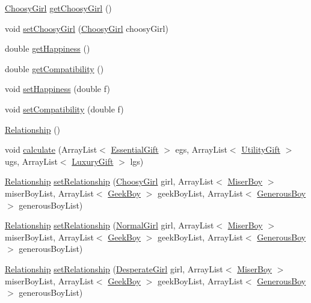 \begin{DoxyCompactItemize}
\item 
\hyperlink{class_girls_1_1_choosy_girl}{Choosy\+Girl} \hyperlink{class_utils_1_1_relationship_afa8ff5fdebceb788e026e8716ed22543}{get\+Choosy\+Girl} ()
\item 
void \hyperlink{class_utils_1_1_relationship_a5bf5b568a52759d00dfd264c2311914d}{set\+Choosy\+Girl} (\hyperlink{class_girls_1_1_choosy_girl}{Choosy\+Girl} choosy\+Girl)
\item 
double \hyperlink{class_utils_1_1_relationship_a9aa237a6824185994c0a4aedc306d23b}{get\+Happiness} ()
\item 
double \hyperlink{class_utils_1_1_relationship_ad7be14b7c0d9e8f29a30b919639c70fd}{get\+Compatibility} ()
\item 
void \hyperlink{class_utils_1_1_relationship_ac72f730e7bdccffc30abc114811ab007}{set\+Happiness} (double f)
\item 
void \hyperlink{class_utils_1_1_relationship_a188a8680e3e3b2277866fbd8906da068}{set\+Compatibility} (double f)
\item 
\hyperlink{class_utils_1_1_relationship_aadc515fc831621baa2451dd5ddcb82f4}{Relationship} ()
\item 
void \hyperlink{class_utils_1_1_relationship_a9e66175fde115be45de08f02508b0006}{calculate} (Array\+List$<$ \hyperlink{class_gifts_1_1_essential_gift}{Essential\+Gift} $>$ egs, Array\+List$<$ \hyperlink{class_gifts_1_1_utility_gift}{Utility\+Gift} $>$ ugs, Array\+List$<$ \hyperlink{class_gifts_1_1_luxury_gift}{Luxury\+Gift} $>$ lgs)
\item 
\hyperlink{class_utils_1_1_relationship}{Relationship} \hyperlink{class_utils_1_1_relationship_aef210c6f2f468e1988319b940e9648cd}{set\+Relationship} (\hyperlink{class_girls_1_1_choosy_girl}{Choosy\+Girl} girl, Array\+List$<$ \hyperlink{class_boys_1_1_miser_boy}{Miser\+Boy} $>$ miser\+Boy\+List, Array\+List$<$ \hyperlink{class_boys_1_1_geek_boy}{Geek\+Boy} $>$ geek\+Boy\+List, Array\+List$<$ \hyperlink{class_boys_1_1_generous_boy}{Generous\+Boy} $>$ generous\+Boy\+List)
\item 
\hyperlink{class_utils_1_1_relationship}{Relationship} \hyperlink{class_utils_1_1_relationship_aafa58e57e84056a3666041f8f85238f1}{set\+Relationship} (\hyperlink{class_girls_1_1_normal_girl}{Normal\+Girl} girl, Array\+List$<$ \hyperlink{class_boys_1_1_miser_boy}{Miser\+Boy} $>$ miser\+Boy\+List, Array\+List$<$ \hyperlink{class_boys_1_1_geek_boy}{Geek\+Boy} $>$ geek\+Boy\+List, Array\+List$<$ \hyperlink{class_boys_1_1_generous_boy}{Generous\+Boy} $>$ generous\+Boy\+List)
\item 
\hyperlink{class_utils_1_1_relationship}{Relationship} \hyperlink{class_utils_1_1_relationship_a5cf184082475c519dbc00ab52d097f6f}{set\+Relationship} (\hyperlink{class_girls_1_1_desperate_girl}{Desperate\+Girl} girl, Array\+List$<$ \hyperlink{class_boys_1_1_miser_boy}{Miser\+Boy} $>$ miser\+Boy\+List, Array\+List$<$ \hyperlink{class_boys_1_1_geek_boy}{Geek\+Boy} $>$ geek\+Boy\+List, Array\+List$<$ \hyperlink{class_boys_1_1_generous_boy}{Generous\+Boy} $>$ generous\+Boy\+List)
\end{DoxyCompactItemize}
